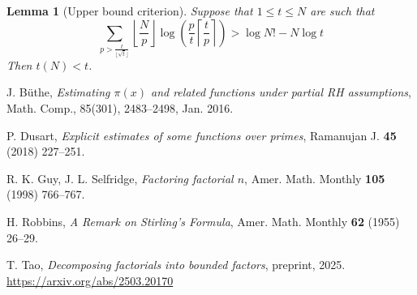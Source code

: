 \documentclass[12pt,a4paper,reqno]{amsart}
\numberwithin{equation}{section}
\theoremstyle{plain}
\newtheorem{lemma}[theorem]{Lemma}
\theoremstyle{definition}
\begin{document}
\begin{lemma}[Upper bound criterion]\label{upper-crit}  \cite[Lemma 2.1]{tao} Suppose that $1 \leq t \leq N$ are such that
  \begin{equation}\label{contra}
     \sum_{p > \frac{t}{\lfloor\sqrt{t}\rfloor}} \left\lfloor \frac{N}{p} \right\rfloor \log \left( \frac{p}{t} \left\lceil \frac{t}{p} \right\rceil \right) > \log N! - N \log t
  \end{equation}
  Then $t(N) < t$.
  \end{lemma}


\begin{thebibliography}{10}

J. B\"uthe, \emph{Estimating $\pi(x)$ and related functions under partial RH assumptions}, Math. Comp., 85(301), 2483--2498, Jan. 2016.

P. Dusart, \emph{Explicit estimates of some functions over primes}, Ramanujan J. \textbf{45} (2018) 227--251.

R. K. Guy, J. L. Selfridge, \emph{Factoring factorial $n$}, Amer. Math. Monthly \textbf{105} (1998) 766--767.

H. Robbins, \emph{A Remark on Stirling's Formula}, Amer. Math. Monthly \textbf{62} (1955) 26--29.

T. Tao, \emph{Decomposing factorials into bounded factors}, preprint, 2025. \url{https://arxiv.org/abs/2503.20170}

\end{thebibliography}
\end{document}
